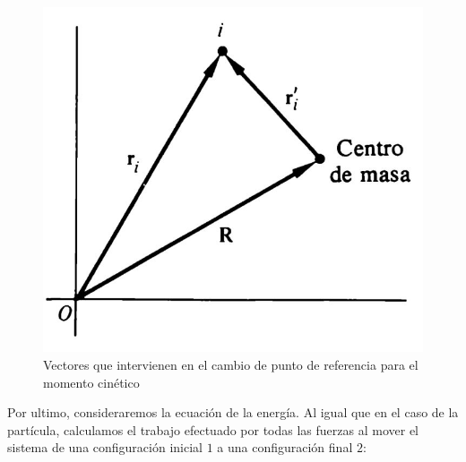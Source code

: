 \documentclass[../main]{subfiles}
\begin{document}
    \begin{figure}
        \centering
        \includegraphics[scale=0.4]{../assets/images/cm.JPG}
        \caption{Vectores que intervienen en el cambio de punto de referencia para el momento cinético}
        \label{fig:fig1}
    \end{figure}
    \vspace{0.2cm}

Por ultimo, consideraremos la ecuación de la energía. Al igual que en el caso de la partícula, calculamos el trabajo efectuado por todas las fuerzas al mover el sistema de una configuración inicial $1$ a una configuración final $2$:
    
\end{document}
